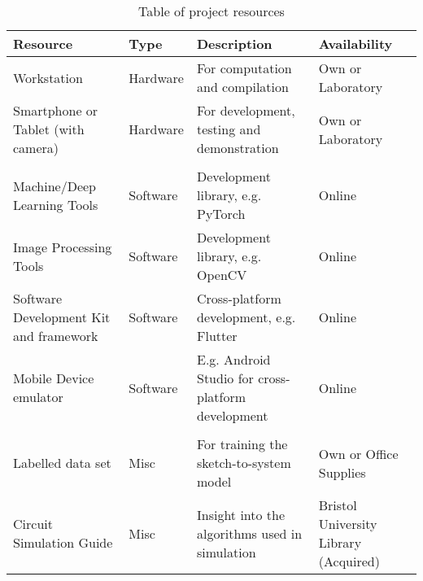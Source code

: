 \documentclass{article}
\begin{document}
\begin{table}[hptb]
  \footnotesize\centering
  \begin{tabular}{
    @{}
    >{\raggedright\arraybackslash}p{5cm}
    >{\raggedright\arraybackslash}p{2cm}
    >{\raggedright\arraybackslash}p{5cm}
    >{\raggedright\arraybackslash}p{4cm}
    @{}}
    Resource                               & Type     & Description                                        & Availability                          \\      
    \toprule 
    Workstation                            & Hardware & For computation and compilation                    & Own or Laboratory                     \\
    Smartphone or Tablet (with camera)     & Hardware & For development, testing and demonstration         & Own or Laboratory                     \\
                                           &          &                                                    &                                       \\
    Machine/Deep Learning Tools            & Software & Development library, e.g. PyTorch                  & Online                                \\
    Image Processing Tools                 & Software & Development library, e.g. OpenCV                   & Online                                \\
    Software Development Kit and framework & Software & Cross-platform development, e.g. Flutter           & Online                                \\
    Mobile Device emulator                 & Software & E.g. Android Studio for cross-platform development & Online                                \\
                                           &          &                                                    &                                       \\
    Labelled data set                      & Misc     & For training the sketch-to-system model            & Own or Office Supplies                \\
    Circuit Simulation Guide               & Misc     & Insight into the algorithms used in simulation     & Bristol University Library (Acquired) \\
  \end{tabular}
  \caption{Table of project resources}
  \label{tab:Table of project resources}
\end{table}
\end{document}

